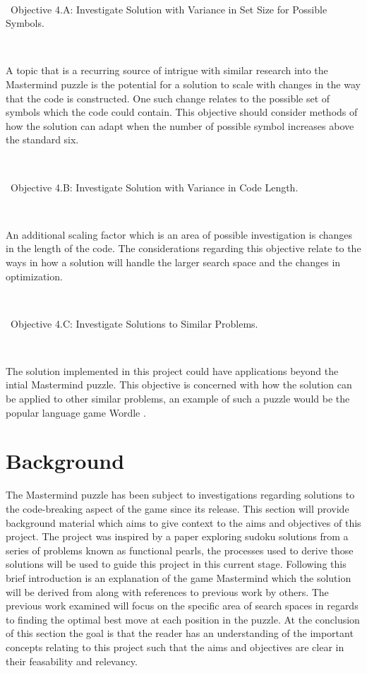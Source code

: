 \documentclass[12pt]{article}  %
\theoremstyle{definition}
\theoremstyle{remark}
\begin{document}
\

\textbullet\ Objective 4.A: Investigate Solution with Variance in Set Size for Possible Symbols.

\

A topic that is a recurring source of intrigue with similar research into the Mastermind puzzle is the potential for a solution to scale with 
changes in the way that the code is constructed. One such change relates to the possible set of symbols which the code could contain. 
This objective should consider methods of how the solution can adapt when the number of possible symbol increases above the standard six.

\

\textbullet\ Objective 4.B: Investigate Solution with Variance in Code Length.

\

An additional scaling factor which is an area of possible investigation is changes in the length of the code. 
The considerations regarding this objective relate to the ways in how a solution will handle the larger search space and the changes in optimization.

\

\textbullet\ Objective 4.C: Investigate Solutions to Similar Problems.

\

The solution implemented in this project could have applications beyond the intial Mastermind puzzle. 
This objective is concerned with how the solution can be applied to other similar problems, an example of such a puzzle would be the popular language game Wordle \cite{Wordle}.

%

\newpage                     %
\section{Background}\label{ss:back}

The Mastermind puzzle has been subject to investigations regarding solutions to the code-breaking aspect of the game
since its release.
This section will provide background material which aims to give context to the aims and objectives of this project. 
The project was inspired by a paper exploring sudoku solutions from a series of problems known as functional pearls, 
the processes used to derive those solutions will be used to guide this project in this current stage. 
Following this brief introduction is an explanation of the game Mastermind which the solution will be derived from along 
with references to previous work by others. The previous work examined will focus on the specific area of search spaces 
in regards to finding the optimal best move at each position in the puzzle. At the conclusion of this section the goal is 
that the reader has an understanding of the important concepts relating to this project such that the aims and objectives
are clear in their feasability and relevancy.
\end{document}
